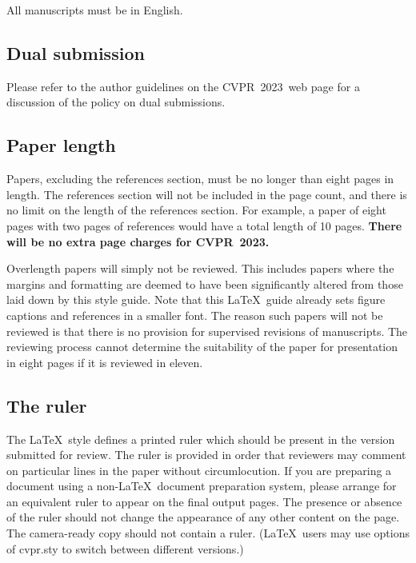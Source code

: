 \documentclass[10pt,twocolumn,letterpaper]{article}
\def\confName{CVPR}
\def\confYear{2023}
\begin{document}
    All manuscripts must be in English.

    \subsection{Dual submission}

    Please refer to the author guidelines on the \confName\ \confYear\ web page for a
    discussion of the policy on dual submissions.

    \subsection{Paper length}
    Papers, excluding the references section, must be no longer than eight pages in length.
    The references section will not be included in the page count, and there is no limit on the length of the references section.
    For example, a paper of eight pages with two pages of references would have a total length of 10 pages.
        {\bf There will be no extra page charges for \confName\ \confYear.}

    Overlength papers will simply not be reviewed.
    This includes papers where the margins and formatting are deemed to have been significantly altered from those laid down by this style guide.
    Note that this \LaTeX\ guide already sets figure captions and references in a smaller font.
    The reason such papers will not be reviewed is that there is no provision for supervised revisions of manuscripts.
    The reviewing process cannot determine the suitability of the paper for presentation in eight pages if it is reviewed in eleven.


    \subsection{The ruler}
    The \LaTeX\ style defines a printed ruler which should be present in the version submitted for review.
    The ruler is provided in order that reviewers may comment on particular lines in the paper without circumlocution.
    If you are preparing a document using a non-\LaTeX\ document preparation system, please arrange for an equivalent ruler to appear on the final output pages.
    The presence or absence of the ruler should not change the appearance of any other content on the page.
    The camera-ready copy should not contain a ruler.
    (\LaTeX\ users may use options of cvpr.sty to switch between different versions.)
\end{document}
